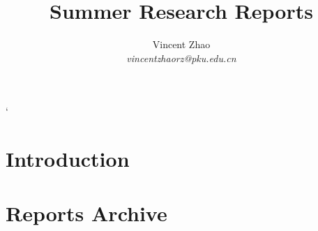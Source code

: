 \documentclass[a4paper, 12pt]{article}
\begin{document}
\title{Summer Research Reports}
\author{Vincent Zhao\\
		\textit{vincentzhaorz@pku.edu.cn}}
\maketitle

\tableofcontents

\newpage`

\section{Introduction}
\section{Reports Archive}

\end{document}
